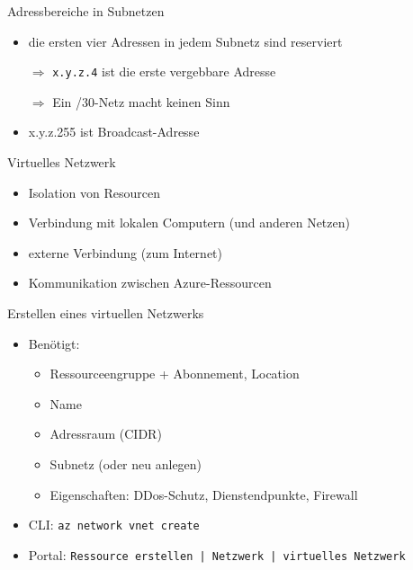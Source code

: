 \begin{flashcard}[Definition]{Adressbereiche in Subnetzen}
    \begin{itemize}
        \item die ersten vier Adressen in jedem Subnetz sind reserviert
        \item[$\Rightarrow$] \texttt{x.y.z.4} ist die erste vergebbare Adresse
        \item[$\Rightarrow$] Ein /30-Netz macht keinen Sinn
        \item x.y.z.255 ist Broadcast-Adresse
    \end{itemize}
\end{flashcard}


\begin{flashcard}[Definition]{Virtuelles Netzwerk}
    \begin{itemize}
        \item Isolation von Resourcen
        \item Verbindung mit lokalen Computern (und anderen Netzen)
        \item externe Verbindung (zum Internet)
        \item Kommunikation zwischen Azure-Ressourcen
    \end{itemize}
\end{flashcard}

\begin{flashcard}[Definition]{Erstellen eines virtuellen Netzwerks}
    \begin{itemize}
        \item Benötigt:
        \begin{itemize}
            \item Ressourceengruppe + Abonnement, Location
            \item Name
            \item Adressraum (CIDR)
            \item Subnetz (oder neu anlegen)
            \item Eigenschaften: DDos-Schutz, Dienstendpunkte, Firewall
        \end{itemize}
        \item CLI: \texttt{az network vnet create}
        \item Portal: \texttt{Ressource erstellen | Netzwerk | virtuelles Netzwerk}
    \end{itemize}
\end{flashcard}

